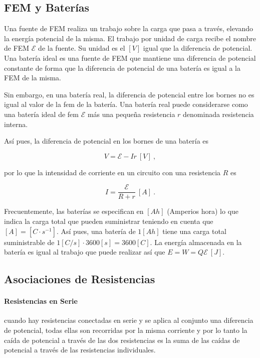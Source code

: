 \documentclass{tufte-handout}
\begin{document}
\subsection{FEM y Baterías}

Una fuente de FEM realiza un trabajo sobre la carga que pasa a través, elevando la energía potencial de la misma. El trabajo por unidad de carga recibe el nombre de FEM $\mathcal{E}$ de la fuente. Su unidad es el $[V]$ igual que la diferencia de potencial. Una batería ideal es una fuente de FEM que mantiene una diferencia de potencial constante de forma que la diferencia de potencial de una batería es igual a la FEM de la misma.

Sin embargo, en una batería real, la diferencia de potencial entre los bornes no es igual al valor de la fem de la batería. Una batería real puede considerarse como una batería ideal de fem $\mathcal{E}$ más una pequeña resistencia $r$ denominada resistencia interna.

Así pues, la diferencia de potencial en los bornes de una batería es

\begin{equation}
V = \mathcal{E} - Ir~[V]~,
\end{equation}

por lo que la intensidad de corriente en un circuito con una resistencia $R$ es

\begin{equation}
I = \frac{\mathcal{E}}{R + r}~[A]~.
\end{equation}

Frecuentemente, las baterías se especifican en $[Ah]$ (Amperios hora) lo que indica la carga total que pueden suministrar teniendo en cuenta que $[A] = [C\cdot s^{-1}]$. Así pues, una batería de $1 [Ah]$ tiene una carga total suministrable de $1 [C/s] \cdot 3600 [s] = 3600 [C]$. La energía almacenada en la batería es igual al trabajo que puede realizar así que $E = W = Q\mathcal{E}~[J]$.

\subsection{Asociaciones de Resistencias}

\paragraph{Resistencias en Serie} cuando hay resistencias conectadas en serie y se aplica al conjunto una diferencia de potencial, todas ellas son recorridas por la misma corriente y por lo tanto la caída de potencial a través de las dos resistencias es la suma de las caídas de potencial a través de las resistencias individuales.
\end{document}
